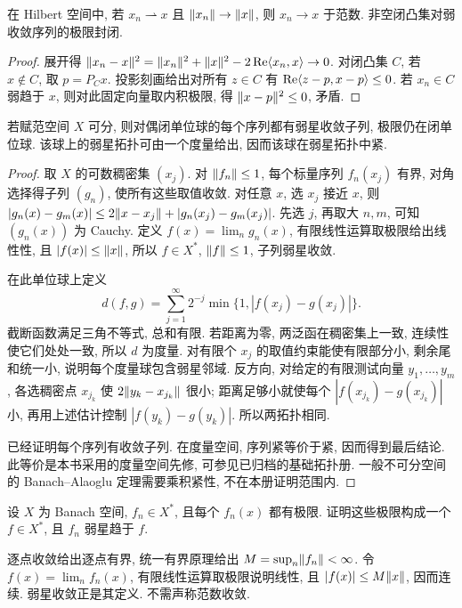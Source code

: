 \begin{proposition}\label{prop:weakstrong}
在 Hilbert 空间中, 若 $x_n\rightharpoonup x$ 且 $\lVert x_n\rVert\to\lVert x\rVert$, 则 $x_n\to x$ 于范数. 非空闭凸集对弱收敛序列的极限封闭.
\end{proposition}
\begin{proof}
展开得 $\lVert x_n-x\rVert^2=\lVert x_n\rVert^2+\lVert x\rVert^2-2\operatorname{Re}\langle x_n,x\rangle\to0$. 对闭凸集 $C$, 若 $x\notin C$, 取 $p=P_Cx$. 投影刻画给出对所有 $z\in C$ 有 $\operatorname{Re}\langle z-p,x-p\rangle\le0$. 若 $x_n\in C$ 弱趋于 $x$, 则对此固定向量取内积极限, 得 $\lVert x-p\rVert^2\le0$, 矛盾.
\end{proof}

\begin{theorem}\label{thm:weakstar-separable}
若赋范空间 $X$ 可分, 则对偶闭单位球的每个序列都有弱星收敛子列, 极限仍在闭单位球. 该球上的弱星拓扑可由一个度量给出, 因而该球在弱星拓扑中紧.
\end{theorem}
\begin{proof}
取 $X$ 的可数稠密集 $(x_j)$. 对 $\lVert f_n\rVert\le1$, 每个标量序列 $f_n(x_j)$ 有界, 对角选择得子列 $(g_n)$, 使所有这些取值收敛. 对任意 $x$, 选 $x_j$ 接近 $x$, 则
$|g_n(x)-g_m(x)|\le2\lVert x-x_j\rVert+|g_n(x_j)-g_m(x_j)|$.
先选 $j$, 再取大 $n,m$, 可知 $(g_n(x))$ 为 Cauchy. 定义 $f(x)=\lim_ng_n(x)$, 有限线性运算取极限给出线性性, 且 $|f(x)|\le\lVert x\rVert$, 所以 $f\in X^*$, $\lVert f\rVert\le1$, 子列弱星收敛.

在此单位球上定义
\[
d(f,g)=\sum_{j=1}^\infty2^{-j}\min\{1,|f(x_j)-g(x_j)|\}.
\]
截断函数满足三角不等式, 总和有限. 若距离为零, 两泛函在稠密集上一致, 连续性使它们处处一致, 所以 $d$ 为度量. 对有限个 $x_j$ 的取值约束能使有限部分小, 剩余尾和统一小, 说明每个度量球包含弱星邻域. 反方向, 对给定的有限测试向量 $y_1,\ldots,y_m$, 各选稠密点 $x_{j_k}$ 使 $2\lVert y_k-x_{j_k}\rVert$ 很小; 距离足够小就使每个 $|f(x_{j_k})-g(x_{j_k})|$ 小, 再用上述估计控制 $|f(y_k)-g(y_k)|$. 所以两拓扑相同.

已经证明每个序列有收敛子列. 在度量空间, 序列紧等价于紧, 因而得到最后结论. 此等价是本书采用的度量空间先修, 可参见已归档的基础拓扑册. 一般不可分空间的 Banach--Alaoglu 定理需要乘积紧性, 不在本册证明范围内.
\end{proof}

\begin{exercise}\label{legacy:ch08:exercise1}
设 $X$ 为 Banach 空间, $f_n\in X^*$, 且每个 $f_n(x)$ 都有极限. 证明这些极限构成一个 $f\in X^*$, 且 $f_n$ 弱星趋于 $f$.
\end{exercise}
\begin{solution}
逐点收敛给出逐点有界, 统一有界原理给出 $M=\sup_n\lVert f_n\rVert<\infty$. 令 $f(x)=\lim_nf_n(x)$, 有限线性运算取极限说明线性, 且 $|f(x)|\le M\lVert x\rVert$, 因而连续. 弱星收敛正是其定义. 不需声称范数收敛.
\end{solution}
